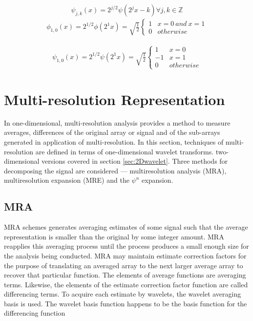 \begin{equation}\label{equ:orthdiatrans1}
\psi_{j,k}(x)  = 2^{j/2} \psi (2 ^j x -k) \forall j,k \in {\mathbb Z} 
\end{equation}
\begin{eqnarray}
\label{equ:haarphi1}
\phi_{1,0}(x) = 2^{1/2} \phi (2 ^1 x ) =  \sqrt{\frac{1}{2}}
\left\{\begin{array}{cc}1 & x = 0\  {and} \ x = 1 \\0 & {otherwise} 
\end{array}\right.
\end{eqnarray}

\begin{eqnarray}\label{equ:haarpsi1}
\psi_{1,0}(x) = 2^{1/2} \psi (2 ^1 x ) = \sqrt{\frac{1}{2}}
 \left\{
\begin{array}{cc}
1 & x= 0 \\
-1 & x = 1 \\
0 & {otherwise}
\end{array}\right. 
\end{eqnarray}



\section{Multi-resolution Representation} \label{sec:multiresolution}

In one-dimensional, multi-resolution analysis provides a method to measure
averages, differences of the original array or signal and of the sub-arrays
generated in application of multi-resolution.  In this section,
techniques of multi-resolution are defined in terms of one-dimensional
wavelet transforms.  two-dimensional versions covered in section
\ref{sec:2Dwavelet}. Three methods for decomposing the signal are considered --- multiresolution analysis (MRA), multiresolution expansion (MRE) and the $\psi^n$ expansion.

\subsection{MRA} 

MRA schemes generates averaging estimates of some signal such that the
average representation is smaller than the original by some integer
amount.  MRA reapplies this averaging process until the process
produces a small enough size for the analysis being conducted.  MRA
may maintain estimate correction factors for the purpose of
translating an averaged array to the next larger average array to
recover that particular function.  The elements of average functions
are averaging terms.  Likewise, the elements of the estimate
correction factor function are called differencing terms.  To acquire
each estimate by wavelets, the wavelet averaging basis is used.  The
wavelet basis function happens to be the basis function for the
differencing function

